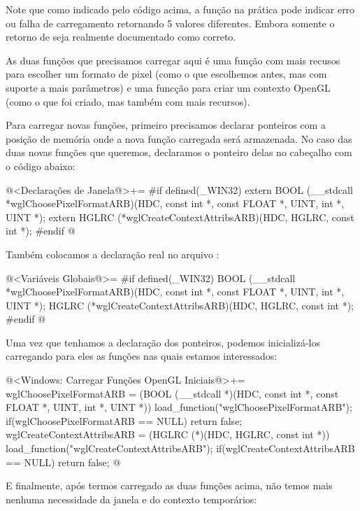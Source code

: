 Note que como indicado pelo código acima, a
função  na prática pode indicar erro ou
falha de carregamento retornando 5 valores diferentes. Embora somente
o retorno de  seja realmente documentado como
correto.

As duas funções que precisamos carregar aqui é uma função com mais
recusos para escolher um formato de pixel (como o que escolhemos
antes, mas com suporte a mais parâmetros) e uma funcção para criar um
contexto OpenGL (como o que foi criado, mas também com mais recursos).

Para carregar novas funções, primeiro precisamos declarar ponteiros
com a posição de memória onde a nova função carregada será
armazenada. No caso das duas novas funções que queremos, declaramos o
ponteiro delas no cabeçalho  com o código abaixo:

\iniciocodigo
@<Declarações de Janela@>+=
#if defined(_WIN32)
extern BOOL (__stdcall *wglChoosePixelFormatARB)(HDC, const int *, const FLOAT *,
                                                 UINT, int *, UINT *);
extern HGLRC (*wglCreateContextAttribsARB)(HDC, HGLRC, const int *);
#endif
@
\fimcodigo

Também colocamos a declaração real no arquivo :

\iniciocodigo
@<Variáveis Globais@>=
#if defined(_WIN32)
BOOL (__stdcall *wglChoosePixelFormatARB)(HDC, const int *, const FLOAT *, UINT,
                                          int *, UINT *);
HGLRC (*wglCreateContextAttribsARB)(HDC, HGLRC, const int *);
#endif
@
\fimcodigo

Uma vez que tenhamos a declaração dos ponteiros, podemos
inicializá-los carregando para eles as funções nas quais estamos
interessados:

\iniciocodigo
@<Windows: Carregar Funções OpenGL Iniciais@>+=
wglChoosePixelFormatARB = (BOOL (__stdcall *)(HDC, const int *, const FLOAT *,
                                              UINT, int *, UINT *))
                          load_function("wglChoosePixelFormatARB");
if(wglChoosePixelFormatARB == NULL) return false;
wglCreateContextAttribsARB = (HGLRC (*)(HDC, HGLRC, const int *))
                               load_function("wglCreateContextAttribsARB");
if(wglCreateContextAttribsARB == NULL) return false;
@
\fimcodigo

E finalmente, após termos carregado as duas funções acima, não temos
mais nenhuma necessidade da janela e do contexto temporários:

